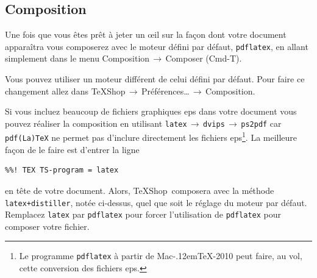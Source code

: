 \documentclass[11pt,french]{article}
\newcommand{\MacTeX}{Mac\kern-.12em\TeX}
\newcommand{\TS}{\textsf{\TeX Shop}}
\newcommand{\acr}[1]{\textsf{#1}}
\newcommand{\cmd}[1]{\textsf{#1}}
\newcommand{\mnu}[1]{\textsf{#1}}
\newcommand{\To}{\,\(\to\)\,}
\begin{document}
\subsection{Composition}

Une fois que vous êtes prêt à jeter un \oe{}il sur la façon dont votre document apparaîtra vous composerez avec le moteur défini par défaut, \texttt{pdflatex}, en allant simplement dans le menu \mnu{Composition}\To\mnu{Composer} (\cmd{Cmd-T}).

Vous pouvez utiliser un moteur différent de celui défini par défaut. Pour faire ce changement allez dans \mnu{TeXShop}\To\mnu{Préférences…}\To\mnu{Composition}.

Si vous incluez beaucoup de fichiers graphiques \acr{eps} dans votre document vous pouvez réaliser la composition en utilisant \texttt{latex}\To\texttt{dvips}\To\texttt{ps2pdf} car \texttt{pdf(La)TeX} ne permet pas d'inclure directement les fichiers \acr{eps}\footnote{Le programme \texttt{pdflatex} à partir de \MacTeX-2010 peut faire, au vol, cette conversion des fichiers \acr{eps}.}. La meilleure façon de le faire est d'entrer la ligne
\begin{verbatim}
%%! TEX TS-program = latex
\end{verbatim}
en tête de votre document. Alors, \TS\ composera avec la méthode \texttt{latex+distiller}, notée ci-dessus, quel que soit le réglage du moteur par défaut. Remplacez \texttt{latex} par \texttt{pdflatex} pour forcer l'utilisation de \texttt{pdflatex} pour composer votre fichier.



\end{document}

